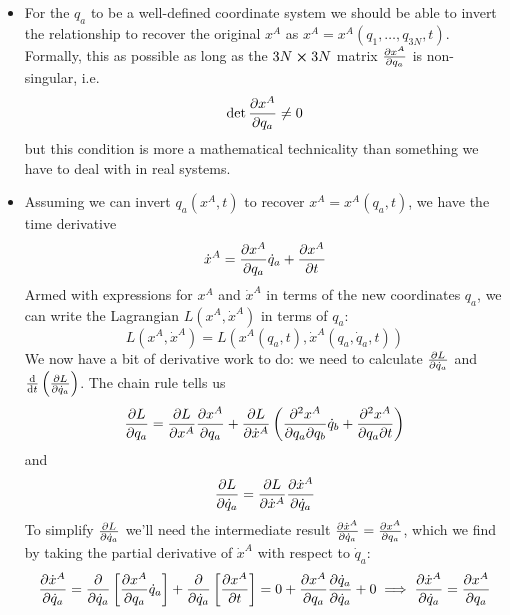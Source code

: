 \documentclass[11pt, a4paper]{article}
\begin{document}
\begin{itemize}
	\item For the $ q_{a} $ to be a well-defined coordinate system we should be able to invert the relationship to recover the original $ x^{A} $ as $ x^{A} = x^{A}(q_{1}, \ldots, q_{3N}, t) $. Formally, this as possible as long as the $ 3N \cross 3N $ matrix $ \pdv{x^{A}}{q_{a}} $ is non-singular, i.e.
	\begin{equation*}
		\det \pdv{x^{A}}{q_{a}} \neq 0
	\end{equation*}
	but this condition is more a mathematical technicality than something we have to deal with in real systems. 
	
	\item Assuming we can invert $ q_{a}(x^{A}, t) $ to recover $ x^{A} = x^{A}(q_{a}, t) $, we have the time derivative
	\begin{equation*}
		\dot{x}^{A} = \pdv{x^{A}}{q_{a}} \dot{q}_{a} + \pdv{x^{A}}{t}
	\end{equation*}
	Armed with expressions for $ x^{A} $ and $ \dot{x}^{A} $ in terms of the new coordinates $ q_{a} $, we can write the Lagrangian $ L(x^{A}, \dot{x}^{A}) $ in terms of $ q_{a} $:
	\begin{equation*}
		L(x^{A}, \dot{x}^{A}) = L\left(x^{A}(q_{a}, t), \dot{x}^{A}(q_{a}, \dot{q}_{a}, t) \right )
	\end{equation*}
	We now have a bit of derivative work to do: we need to calculate $ \pdv{L}{\dot{q}_{a}}  $ and $ \dv{}{t} \left (\pdv{L}{\dot{q}_{a}}\right)  $. The chain rule tells us
	\begin{equation*}
		\pdv{L}{q_{a}} = \pdv{L}{x^{A}}\pdv{x^{A}}{q_{a}} + \pdv{L}{\dot{x}^{A}}\left(\pdv{x^{A}}{q_{a}}{q_{b}}\dot{q}_{b}+ \pdv{x^{A}}{q_{a}}{t} \right)
	\end{equation*}
	and 
	\begin{equation*}
		\pdv{L}{\dot{q}_{a}} = \pdv{L}{\dot{x}^{A}} \pdv{\dot{x}^{A}}{\dot{q}_{a}}
	\end{equation*}
	To simplify $ \pdv{L}{\dot{q}_{a}} $ we'll need the intermediate result $ \pdv{\dot{x}^{A}}{\dot{q}_{a}} = \pdv{x^{A}}{q_{a}} $, which we find by taking the partial derivative of $ \dot{x}^{A} $ with respect to $ \dot{q}_{a} $: 
	\begin{equation*}
		\pdv{\dot{x}^{A}}{\dot{q}_{a}} = \pdv{}{\dot{q}_{a}}\left[\pdv{x^{A}}{q_{a}} \dot{q}_{a}\right] + \pdv{}{\dot{q}_{a}} \left[\pdv{x^{A}}{t}\right] = 0 + \pdv{x^{A}}{q_{a}} \pdv{\dot{q}_{a}}{\dot{q}_{a}} + 0 \implies \pdv{\dot{x}^{A}}{\dot{q}_{a}} = \pdv{x^{A}}{q_{a}} 
	\end{equation*}

\end{itemize}
\end{document}
